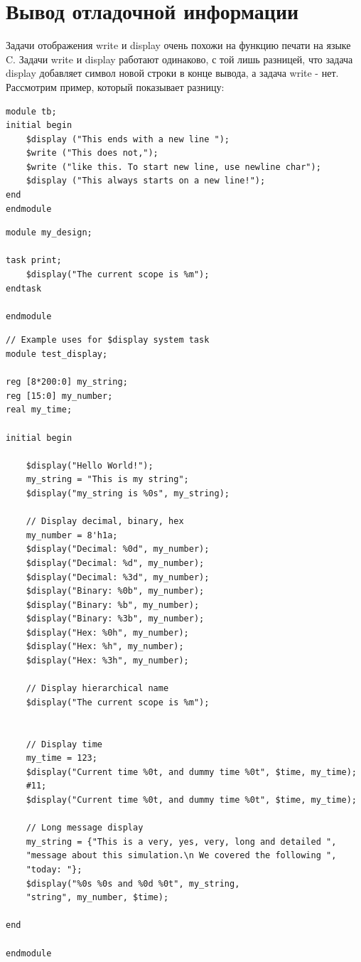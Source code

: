 \documentclass[a4paper,oneside ,10pt]{extreport}
\begin{document}
\section{Вывод отладочной информации}

Задачи отображения write и display очень похожи на функцию печати на языке C. Задачи write и display работают одинаково, с той лишь разницей, что задача display добавляет символ новой строки в конце вывода, а задача write - нет. Рассмотрим пример, который показывает разницу:

\begin{Verbatim}[tabsize=4]
module tb;  
initial begin  
	$display ("This ends with a new line ");  
	$write ("This does not,");  
	$write ("like this. To start new line, use newline char");  
	$display ("This always starts on a new line!");  
end  
endmodule
\end{Verbatim}

\begin{Verbatim}[tabsize=4]
module my_design;

task print;
	$display("The current scope is %m");
endtask

endmodule
\end{Verbatim}

\begin{Verbatim}[tabsize=4]
// Example uses for $display system task
module test_display;

reg [8*200:0] my_string;
reg [15:0] my_number;
real my_time;

initial begin

	$display("Hello World!");
	my_string = "This is my string";
	$display("my_string is %0s", my_string);

	// Display decimal, binary, hex
	my_number = 8'h1a;
	$display("Decimal: %0d", my_number);
	$display("Decimal: %d", my_number);
	$display("Decimal: %3d", my_number);
	$display("Binary: %0b", my_number);
	$display("Binary: %b", my_number);
	$display("Binary: %3b", my_number);
	$display("Hex: %0h", my_number);
	$display("Hex: %h", my_number);
	$display("Hex: %3h", my_number);

	// Display hierarchical name
	$display("The current scope is %m");


	// Display time
	my_time = 123;
	$display("Current time %0t, and dummy time %0t", $time, my_time);
	#11;
	$display("Current time %0t, and dummy time %0t", $time, my_time);

	// Long message display
	my_string = {"This is a very, yes, very, long and detailed ",
	"message about this simulation.\n We covered the following ",
	"today: "};
	$display("%0s %0s and %0d %0t", my_string, 
	"string", my_number, $time);

end

endmodule
\end{Verbatim}
\end{document}
